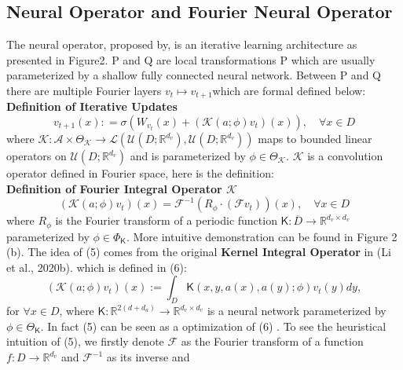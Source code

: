 \documentclass[conference]{IEEEtran}
\begin{document}
\subsection{Neural Operator and Fourier Neural Operator}
The neural operator, proposed by\cite{b19}, is an iterative learning architecture as presented in Figure2. P and Q are local transformations P which are usually parameterized by a shallow fully connected neural network. Between P and Q there are multiple Fourier layers $v_{t} \mapsto v_{t+1}$which are formal defined below: \\
\textbf{Definition of Iterative Updates}
\begin{equation}
v_{t+1} \left( x \right) : = \sigma \left( W_{v_{t}} \left( x \right) + \left( \mathcal{K} \left( a;\phi \right) v_{t} \right) \left( x \right) \right), \quad \forall x \in D
\label{eq}
\end{equation}
where $\mathcal{K} : \mathcal{A} \times \Theta_{\mathcal{K}} \rightarrow \mathcal{L} \left( \mathcal{U} \left( D;\mathbb{R}^{d_{v}} \right), \mathcal{U} \left( D;\mathbb{R}^{d_{v}} \right) \right) $ maps to bounded linear operators on $\mathcal{U} \left( D;\mathbb{R}^{d_{v}} \right)$ and is parameterized by $\phi \in \Theta_{\mathcal{K}}$. $\mathcal{K}$ is a convolution operator defined in Fourier space, here is the definition: \\
\textbf{Definition of Fourier Integral Operator $\mathcal{K}$}
\begin{equation}
\left( \mathcal{K} \left( a; \phi \right) v_{t} \right) \left( x \right) = \mathcal{F}^{-1} \left( R_{\phi} \cdot \left( \mathcal{F} v_{t} \right) \right) \left( x \right), \quad \forall x \in D
\label{eq}
\end{equation}
where $R_{\phi}$ is the Fourier transform of a periodic function $\mathsf{K} : \overline{D} \rightarrow \mathbb{R}^{d_{v} \times d_{v}}$ parameterized by $\phi \in \Phi_{\mathsf{K}}$. More intuitive demonstration can be found in Figure 2 (b).
The idea of (5) comes from the original \textbf{Kernel Integral Operator} in (Li et al., 2020b). which is defined in (6):
\begin{equation}
\left( \mathcal{K} \left( a;\phi \right) v_{t} \right) \left( x \right) :=
\int_{D} \mathsf{K} \left( x,y,a \left( x \right), a \left( y \right); \phi \right) v_{t} \left( y \right) dy,
\label{eq}
\end{equation}
for $\forall x \in D$, where $\mathsf{K}: \mathbb{R}^{2 \left( d + d_{a} \right)} \rightarrow \mathbb{R}^{{d_{v} \times d_{v}} }$ is a neural network parameterized by $\phi \in \Theta_{\mathsf{K}}$. In fact (5) can be seen as a optimization of (6) . To see the heuristical intuition of (5), we firstly denote $\mathcal{F}$ as the Fourier transform of a function $ f : D \rightarrow \mathbb{R}^{d_{v}}$ and $\mathcal{F^{-1}}$ as its inverse and
\end{document}
